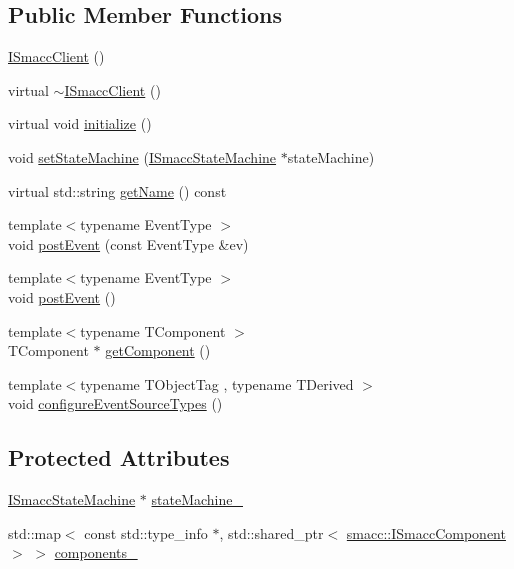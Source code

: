 \subsection*{Public Member Functions}
\begin{DoxyCompactItemize}
\item 
\hyperlink{classsmacc_1_1ISmaccClient_a40222ad8b9b7962755434025b1fd5ae7}{I\+Smacc\+Client} ()
\item 
virtual \hyperlink{classsmacc_1_1ISmaccClient_a030e17771bf2e404a6fad97273c4d7f4}{$\sim$\+I\+Smacc\+Client} ()
\item 
virtual void \hyperlink{classsmacc_1_1ISmaccClient_a974ebb6ad6cf812e7b9de6b78b3d901f}{initialize} ()
\item 
void \hyperlink{classsmacc_1_1ISmaccClient_a28fd6ca2bcf9c5e57f3cc16fb0a076d3}{set\+State\+Machine} (\hyperlink{classsmacc_1_1ISmaccStateMachine}{I\+Smacc\+State\+Machine} $\ast$state\+Machine)
\item 
virtual std\+::string \hyperlink{classsmacc_1_1ISmaccClient_a20846aabfd1de832aa27d7a8237a1742}{get\+Name} () const 
\item 
{\footnotesize template$<$typename Event\+Type $>$ }\\void \hyperlink{classsmacc_1_1ISmaccClient_a46cbc0d695214efe40d29247323bfc80}{post\+Event} (const Event\+Type \&ev)
\item 
{\footnotesize template$<$typename Event\+Type $>$ }\\void \hyperlink{classsmacc_1_1ISmaccClient_a21a79203cb44fc717d4d977c190327c6}{post\+Event} ()
\item 
{\footnotesize template$<$typename T\+Component $>$ }\\T\+Component $\ast$ \hyperlink{classsmacc_1_1ISmaccClient_adef78db601749ca63c19e74a27cb88cc}{get\+Component} ()
\item 
{\footnotesize template$<$typename T\+Object\+Tag , typename T\+Derived $>$ }\\void \hyperlink{classsmacc_1_1ISmaccClient_a643285b93f2bd33987e0d0d1a12caf10}{configure\+Event\+Source\+Types} ()
\end{DoxyCompactItemize}
\subsection*{Protected Attributes}
\begin{DoxyCompactItemize}
\item 
\hyperlink{classsmacc_1_1ISmaccStateMachine}{I\+Smacc\+State\+Machine} $\ast$ \hyperlink{classsmacc_1_1ISmaccClient_a926e4f2ae796def63d48dca389a48c47}{state\+Machine\+\_\+}
\item 
std\+::map$<$ const std\+::type\+\_\+info $\ast$, std\+::shared\+\_\+ptr$<$ \hyperlink{classsmacc_1_1ISmaccComponent}{smacc\+::\+I\+Smacc\+Component} $>$ $>$ \hyperlink{classsmacc_1_1ISmaccClient_ab983e85d296c9660f5943c1d511634ce}{components\+\_\+}
\end{DoxyCompactItemize}
